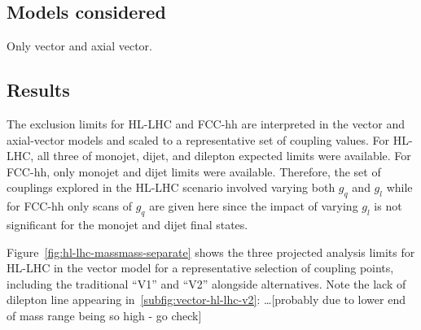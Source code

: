 \documentclass[11pt]{article}
\begin{document}

\subsection{Models considered}

Only vector and axial vector.

\subsection{Results}

The exclusion limits for HL-LHC and FCC-hh are interpreted in the vector and axial-vector models and scaled to a representative set of coupling values. For HL-LHC, all three of monojet, dijet, and dilepton expected limits were available. For FCC-hh, only monojet and dijet limits were available. Therefore, the set of couplings explored in the HL-LHC scenario involved varying both $g_q$ and $g_l$ while for FCC-hh only scans of $g_q$ are given here since the impact of varying $g_l$ is not significant for the monojet and dijet final states.

Figure~\ref{fig:hl-lhc-massmass-separate} shows the three projected analysis limits for HL-LHC in the vector model for a representative selection of coupling points, including the traditional ``V1'' and ``V2'' alongside alternatives.  Note the lack of dilepton line appearing in~\ref{subfig:vector-hl-lhc-v2}: \ldots [probably due to lower end of mass range being so high - go check]
\end{document}
